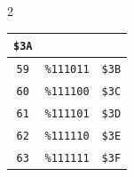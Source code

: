 \begin{multicols}{2}
\begin{center}
\begin{tabular}{|c|c|c|}
\texttt{\$3A} \\ \hline \texttt{59} & \texttt{\%111011} &  \texttt{\$3B} \\ \hline \texttt{60} & \texttt{\%111100} &  \texttt{\$3C} \\ \hline \texttt{61} & \texttt{\%111101} &  \texttt{\$3D} \\ \hline \texttt{62} & \texttt{\%111110} &  \texttt{\$3E} \\ \hline \texttt{63} & \texttt{\%111111} &  \texttt{\$3F} \\ \hline
			\end{tabular}
		\end{center}
\end{multicols}

\vspace*{\fill}

\clearpage

\vspace*{\fill}

